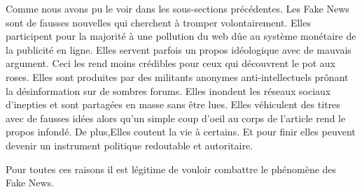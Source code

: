 Comme nous avons pu le voir dans les sous-sections précédentes.
Les Fake News sont de fausses nouvelles qui cherchent à tromper volontairement.
Elles participent pour la majorité à une pollution du web dûe au système monétaire de la publicité en ligne.
Elles servent parfois un propos idéologique avec de mauvais argument.
Ceci les rend moins crédibles pour ceux qui découvrent le pot aux roses.
Elles sont produites par des militants anonymes anti-intellectuels prônant la désinformation sur de sombres forums.
Elles inondent les réseaux sociaux d'inepties et sont partagées en masse sans être lues.
Elles véhiculent des titres avec de fausses idées alors qu'un simple coup d'oeil au corps de l'article rend le propos infondé.
De plus,Elles coutent la vie à certains.
Et pour finir elles peuvent devenir un instrument politique redoutable et autoritaire.

Pour toutes ces raisons il est légitime de vouloir combattre le phénomène des Fake News.
